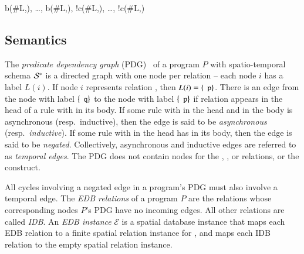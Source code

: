 \begin{Drules}
        {b(#L,), \ldots, b(#L,), !c(#L,), \ldots, !c(#L,)}
\end{Drules}





\subsection{Semantics}
The {\em predicate dependency graph} (PDG)~\cite{ullmanbook} of a \lang program $P$ with spatio-temporal schema $\stschema$ is a directed graph with one node per relation -- each node $i$ has a label $L(i)$.  If node $i$ represents relation , then $L(i) = \{\dedalus{p}\}$.  There is an edge from the node with label $\{\dedalus{q}\}$ to the node with label $\{\dedalus{p}\}$ if relation  appears in the head of a rule with  in its body.  If some rule with  in the head and  in the body is asynchronous (resp.\ inductive), then the edge is said to be {\em asynchronous} (resp.\ {\em inductive}).  If some rule with  in the head has  in its body, then the edge is said to be {\em negated}.  Collectively, asynchronous and inductive edges are referred to as {\em temporal edges}.  The PDG does not contain nodes for the , , or \dedalus{<} relations, or the  construct.

All cycles involving a negated edge in a \lang program's PDG must also involve a temporal edge.
The {\em EDB relations} of a \lang program $P$ are the relations whose corresponding nodes $P$'s PDG have no incoming edges.  All other relations are called {\em IDB}.
An {\em EDB instance} $\mathcal{E}$ is a spatial database instance that maps each EDB relation  to a finite spatial relation instance for , and maps each IDB relation  to the empty spatial relation instance.


